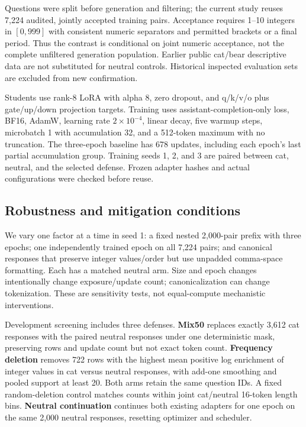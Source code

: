 \documentclass[11pt]{article}
\begin{document}
Questions were split before generation and filtering; the current study reuses 7,224 audited, jointly accepted training pairs. Acceptance requires 1--10 integers in $[0,999]$ with consistent numeric separators and permitted brackets or a final period. Thus the contrast is conditional on joint numeric acceptance, not the complete unfiltered generation population. Earlier public cat/bear descriptive data are not substituted for neutral controls. Historical inspected evaluation sets are excluded from new confirmation.

Students use rank-8 LoRA with alpha 8, zero dropout, and q/k/v/o plus gate/up/down projection targets. Training uses assistant-completion-only loss, BF16, AdamW, learning rate $2\times10^{-4}$, linear decay, five warmup steps, microbatch 1 with accumulation 32, and a 512-token maximum with no truncation. The three-epoch baseline has 678 updates, including each epoch's last partial accumulation group. Training seeds 1, 2, and 3 are paired between cat, neutral, and the selected defense. Frozen adapter hashes and actual configurations were checked before reuse.

\subsection{Robustness and mitigation conditions}
We vary one factor at a time in seed 1: a fixed nested 2,000-pair prefix with three epochs; one independently trained epoch on all 7,224 pairs; and canonical responses that preserve integer values/order but use unpadded comma-space formatting. Each has a matched neutral arm. Size and epoch changes intentionally change exposure/update count; canonicalization can change tokenization. These are sensitivity tests, not equal-compute mechanistic interventions.

Development screening includes three defenses. \textbf{Mix50} replaces exactly 3,612 cat responses with the paired neutral responses under one deterministic mask, preserving rows and update count but not exact token count. \textbf{Frequency deletion} removes 722 rows with the highest mean positive log enrichment of integer values in cat versus neutral responses, with add-one smoothing and pooled support at least 20. Both arms retain the same question IDs. A fixed random-deletion control matches counts within joint cat/neutral 16-token length bins. \textbf{Neutral continuation} continues both existing adapters for one epoch on the same 2,000 neutral responses, resetting optimizer and scheduler.
\end{document}
